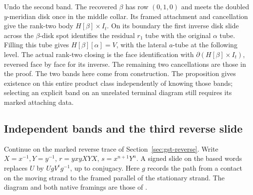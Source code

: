 \documentclass[11pt,letterpaper]{article}
\numberwithin{equation}{section}
\theoremstyle{remark}
\begin{document}
Undo the second band. The recovered \(\beta\) has row \((0,1,0)\)
and meets the doubled \(y\)-meridian disk once in the middle collar.
Its framed attachment and cancellation give the rank-two body
\(H[\beta]\times I_t\). On its boundary the first inverse disk slide
across the \(\beta\)-disk spot identifies the residual \(r_1\) tube
with the original \(\alpha\) tube. Filling this tube gives
\(H[\beta][\alpha]=V\), with the lateral \(a\)-tube at the following
level. The actual rank-two closing is the face identification with
\(\partial(H[\beta]\times I_t)\), reversed face by face for its
inverse. The remaining two cancellations are those in the proof.
The two bands here come from construction. The proposition gives
existence on this entire product class independently of knowing those
bands; selecting an explicit band on an unrelated terminal diagram
still requires its marked attaching data.

\subsection{Independent bands and the third reverse slide}\label{sec:gst-three}
Continue on the marked reverse trace of Section~\ref{sec:gst-reverse}.
Write \(X=x^{-1},Y=y^{-1}\), \(r=yxyXYX\), \(s=x^{n+1}Y^n\).
A signed slide on the based words replaces \(U\) by
\(U g V^\epsilon g^{-1}\), up to conjugacy. Here \(g\) records the
path from a contact on the moving strand to the framed parallel of
the stationary strand. The diagram and both native framings are those
of \cite[\S\S2,7, Figures 9--13]{GompfScharlemannThompson2010}.
\end{document}
